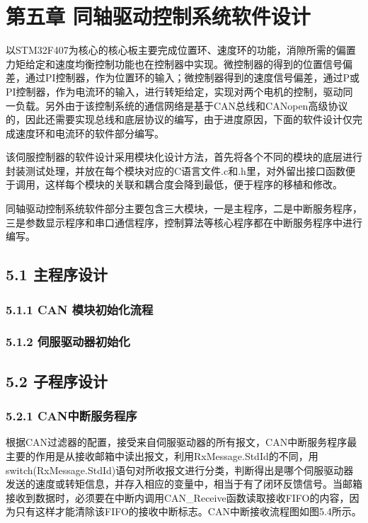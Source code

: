 \documentclass[UTF8,zihao=-4,openany,oneside]{ctexbook}
\begin{document}
\chapter{第五章 同轴驱动控制系统软件设计}

以STM32F407为核心的核心板主要完成位置环、速度环的功能，消隙所需的偏置力矩给定和速度均衡控制功能也在控制器中实现。微控制器的得到的位置信号偏差，通过PI控制器，作为位置环的输入；微控制器得到的速度信号偏差，通过P或PI控制器，作为电流环的输入，进行转矩给定，实现对两个电机的控制，驱动同一负载。另外由于该控制系统的通信网络是基于CAN总线和CANopen高级协议的，因此还需要实现总线和底层协议的编写，由于进度原因，下面的软件设计仅完成速度环和电流环的软件部分编写。

该伺服控制器的软件设计采用模块化设计方法，首先将各个不同的模块的底层进行封装测试处理，并放在每个模块对应的C语言文件.c和.h里，对外留出接口函数便于调用，这样每个模块的关联和耦合度会降到最低，便于程序的移植和修改。

同轴驱动控制系统软件部分主要包含三大模块，一是主程序，二是中断服务程序，三是参数显示程序和串口通信程序，控制算法等核心程序都在中断服务程序中进行编写。

\section{5.1 主程序设计}

\subsection{5.1.1 CAN 模块初始化流程}

\subsection{5.1.2 伺服驱动器初始化}

\section{5.2 子程序设计}

\subsection{5.2.1 CAN中断服务程序}

根据CAN过滤器的配置，接受来自伺服驱动器的所有报文，CAN中断服务程序最主要的作用是从接收邮箱中读出报文，利用RxMessage.StdId的不同，用switch(RxMessage.StdId)语句对所收报文进行分类，判断得出是哪个伺服驱动器发送的速度或转矩信息，并存入相应的变量中，相当于有了闭环反馈信号。当邮箱接收到数据时，必须要在中断内调用CAN\_Receive函数读取接收FIFO的内容，因为只有这样才能清除该FIFO的接收中断标志。CAN中断接收流程图如图5.4所示。
\end{document}
